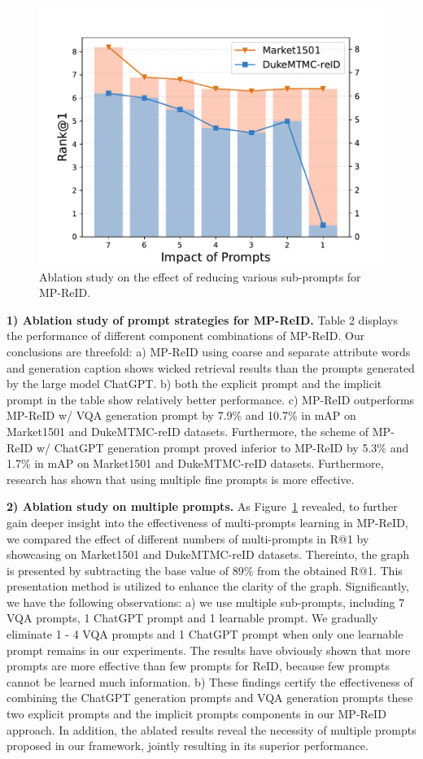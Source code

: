 \documentclass[letterpaper]{article} %
\begin{document}
\begin{figure}[t!]
    \centering
    \label{visual1}
    \includegraphics[width=0.8\linewidth]{multiprompts.pdf}
    \caption{Ablation study on the effect of reducing various sub-prompts for MP-ReID.}
    \label{visual1}
\end{figure}

\textbf{1) Ablation study of prompt strategies for MP-ReID.} Table 2 displays the performance of different component combinations of MP-ReID. Our conclusions are threefold: a) MP-ReID using coarse and separate attribute words and generation caption shows wicked retrieval results than the prompts generated by the large model ChatGPT. b) both the explicit prompt and the implicit prompt in the table show relatively better performance. c) MP-ReID outperforms MP-ReID w/ VQA generation prompt by 7.9\% and 10.7\% in mAP on Market1501 and DukeMTMC-reID datasets. Furthermore, the scheme of MP-ReID w/ ChatGPT generation prompt proved inferior to MP-ReID by 5.3\% and 1.7\% in mAP on Market1501 and DukeMTMC-reID datasets. Furthermore, research has shown that using multiple fine prompts is more effective.

\textbf{2) Ablation study on multiple prompts.} As Figure~\ref{visual1} revealed, to further gain deeper insight into the effectiveness of multi-prompts learning in MP-ReID, we compared the effect of different numbers of multi-prompts in R@1 by showcasing on Market1501 and DukeMTMC-reID datasets. Thereinto, the graph is presented by subtracting the base value of 89\% from the obtained R@1. This presentation method is utilized to enhance the clarity of the graph. Significantly, we have the following observations: a) we use multiple sub-prompts, including 7 VQA prompts, 1 ChatGPT prompt and 1 learnable prompt. We gradually eliminate 1 - 4 VQA prompts and 1 ChatGPT prompt when only one learnable prompt remains in our experiments. The results have obviously shown that more prompts are more effective than few prompts for ReID, because few prompts cannot be learned much information. b) These findings certify the effectiveness of combining the ChatGPT generation prompts and VQA generation prompts these two explicit prompts and the implicit prompts components in our MP-ReID approach. In addition, the ablated results reveal the necessity of multiple prompts proposed in our framework, jointly resulting in its superior performance.
\end{document}
